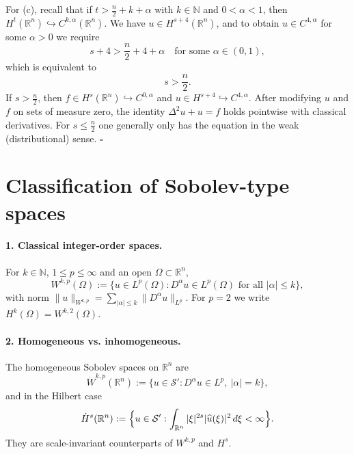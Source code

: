 \documentclass[12pt,a4paper]{article}
\newcommand{\qed}{\hfill$\square$}
\theoremstyle{plain}
\theoremstyle{definition}
\theoremstyle{remark}
\theoremstyle{remark}
\begin{document}
\medskip

For (c), recall that if $t> \frac n2 + k + \alpha$ with $k\in\mathbb N$ and $0<\alpha<1$,
then $H^t(\mathbb R^n)\hookrightarrow C^{k,\alpha}(\mathbb R^n)$.
We have $u\in H^{s+4}(\mathbb R^n)$, and to obtain $u\in C^{4,\alpha}$ for some $\alpha>0$
we require
\[
s+4 > \frac n2 + 4 + \alpha
\quad\text{for some } \alpha\in(0,1),
\]
which is equivalent to
\[
s > \frac n2.
\]
If $s>\frac n2$, then $f\in H^s(\mathbb R^n)\hookrightarrow C^{0,\alpha}$ and
$u\in H^{s+4}\hookrightarrow C^{4,\alpha}$.
After modifying $u$ and $f$ on sets of measure zero, the identity
$\Delta^2 u + u = f$ holds pointwise with classical derivatives.
For $s\le \frac n2$ one generally only has the equation in the weak (distributional) sense.
\qed

\section*{Classification of Sobolev-type spaces}

\paragraph{1. Classical integer-order spaces.}
For $k\in\mathbb N$, $1\le p\le\infty$ and an open $\Omega\subset\mathbb R^n$,
\[
W^{k,p}(\Omega)
:= \{u\in L^p(\Omega): D^\alpha u\in L^p(\Omega)\text{ for all }|\alpha|\le k\},
\]
with norm $\|u\|_{W^{k,p}}=\sum_{|\alpha|\le k}\|D^\alpha u\|_{L^p}$.
For $p=2$ we write $H^k(\Omega)=W^{k,2}(\Omega)$.

\medskip

\paragraph{2. Homogeneous vs. inhomogeneous.}
The homogeneous Sobolev spaces on $\mathbb R^n$ are
\[
\dot W^{k,p}(\mathbb R^n)
:= \{u\in\mathcal S' : D^\alpha u\in L^p,\ |\alpha|=k\},
\]
and in the Hilbert case
\[
\dot H^s(\mathbb R^n)
:= \Bigl\{u\in\mathcal S' : \int_{\mathbb R^n}|\xi|^{2s}|\widehat u(\xi)|^2\,d\xi<\infty\Bigr\}.
\]
They are scale-invariant counterparts of $W^{k,p}$ and $H^s$.

\medskip
\end{document}
